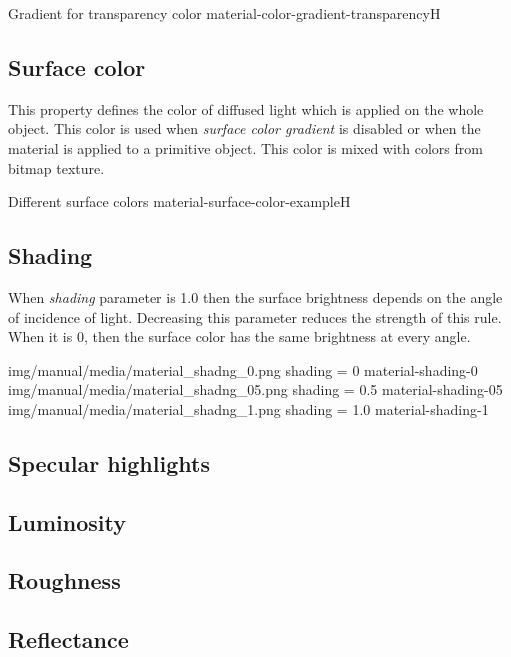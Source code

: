 {Gradient for transparency color}
{material-color-gradient-transparency}{H}

\subsection{Surface color}\label{materials-surface_color}

This property defines the color of diffused light which is applied on the whole object. This color is used when \emph{surface color gradient} is disabled or when the material is applied to a primitive object.
This  color is mixed with colors from bitmap texture.

{Different surface colors}
{material-surface-color-example}{H}

\subsection{Shading}\label{materials-shading}

When \emph{shading} parameter is 1.0 then the surface brightness depends on the angle of incidence of light. Decreasing this parameter reduces the strength of this rule. When it is 0, then the surface color has the same brightness at every angle. 

\threeImagesWithTwoCaptionsFullWidth
{img/manual/media/material_shadng_0.png}
{shading = 0}
{material-shading-0}
{img/manual/media/material_shadng_05.png}
{shading = 0.5}
{material-shading-05}
{img/manual/media/material_shadng_1.png}
{shading = 1.0}
{material-shading-1}


\subsection{Specular highlights}\label{materials-specular}

\subsection{Luminosity}\label{materials-luminosity}

\subsection{Roughness}\label{materials-roughness}

\subsection{Reflectance}\label{materials-reflectance}

